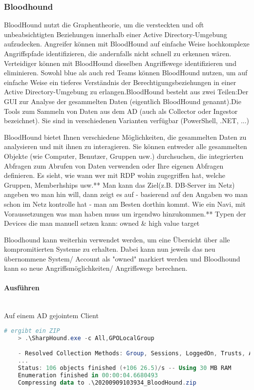 \subsubsection{Bloodhound}
BloodHound nutzt die Graphentheorie, um die versteckten und oft unbeabsichtigten Beziehungen innerhalb einer Active Directory-Umgebung aufzudecken. Angreifer können mit BloodHound auf einfache Weise hochkomplexe Angriffspfade identifizieren, die andernfalls nicht schnell zu erkennen wären. Verteidiger können mit BloodHound dieselben Angriffswege identifizieren und eliminieren. Sowohl blue als auch red Teams können BloodHound nutzen, um auf einfache Weise ein tieferes Verständnis der Berechtigungsbeziehungen in einer Active Directory-Umgebung zu erlangen.BloodHound besteht aus zwei Teilen:Der GUI zur Analyse der gesammelten Daten (eigentlich BloodHound genannt).Die Tools zum Sammeln von Daten aus dem AD (auch als Collector oder Ingestor bezeichnet). Sie sind in verschiedenen Varianten verfügbar (PowerShell, .NET, ...)

BloodHound bietet Ihnen verschiedene Möglichkeiten, die gesammelten Daten zu analysieren und mit ihnen zu interagieren. Sie können entweder alle gesammelten Objekte (wie Computer, Benutzer, Gruppen usw.) durchsuchen, die integrierten Abfragen zum Abrufen von Daten verwenden oder Ihre eigenen Abfragen definieren. Es sieht, wie wann wer mit RDP wohin zugegriffen hat, welche Gruppen, Memberhships usw.** Man kann das Ziel(z.B. DB-Server im Netz) angeben wo man hin will, dann zeigt es auf - basierend auf den Angaben wo man schon im Netz kontrolle hat - man am Besten dorthin kommt. Wie ein Navi, mit Voraussetzungen was man haben muss um irgendwo hinzukommen.** Typen der Devices die man manuell setzen kann: owned \& high value target

Bloodhound kann weiterhin verwendet werden, um eine Übersicht über alle kompromitierten Systeme zu erhalten. Dabei kann nun jeweils das neu übernommene System/ Account als "owned" markiert werden und Bloodhound kann so neue Angriffsmöglichkeiten/ Angriffswege berechnen.

\paragraph{Ausführen}\mbox{} \\
Auf einem AD gejointem Client

\begin{lstlisting}[language=PowerShell]
    # ergibt ein ZIP
    > .\SharpHound.exe -c All,GPOLocalGroup

    - Resolved Collection Methods: Group, Sessions, LoggedOn, Trusts, ACL, ObjectProps, LocalGroups, SPNTargets, Container, GPOLocalGroup
    ...
    Status: 106 objects finished (+106 26.5)/s -- Using 30 MB RAM
    Enumeration finished in 00:00:04.6680493
    Compressing data to .\20200909103934_BloodHound.zip    
\end{lstlisting}

